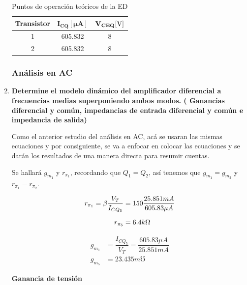 \begin{enumerate}
        \begin{table}[H]
          \centering
          \begin{tabular}{|c |c |c|}
            \hline %
            \textbf{Transistor} & $\mathbf{I_{CQ}[\mu A]}$ & $\mathbf{V_{CEQ}[\volt]}$ \\
            \hline
            1                   & 605.832                  & 8                         \\
            \hline
            2                   & 605.832                  & 8                         \\
            \hline
          \end{tabular}
          \caption{Puntos de operación teóricos de la ED}
          \label{tab:ptos_ed}
        \end{table}

        \subsubsection{Análisis en AC}

  \item \textbf{Determine el modelo dinámico del amplificador diferencial a frecuencias medias superponiendo ambos modos. ( Ganancias diferencial y común, impedancias de entrada diferencial y común e impedancia de salida)}

        Como el anterior estudio del análisis en AC, acá se usaran las mismas ecuaciones y por consiguiente, se va a enfocar en colocar las ecuaciones y se darán los resultados de una manera directa para resumir cuentas.

        Se hallará $g_{m_1}$ y $r_{\pi_1}$, recordando que $Q_1=Q_2$, así tenemos que $g_{m_1}=g_{m_2}$ y $r_{\pi_1}=r_{\pi_2}$.

        \begin{align*}
          r_{\pi_1}= \beta \dfrac{V_T}{I_{CQ_5}} & =150 \dfrac{25.851 mA}{605.83 \mu A} \nonumber \\[0.2cm]
          r_{\pi_5}                              & =6.4k \ohm
        \end{align*}

        \begin{align*}
          g_{m_1} & =\dfrac{I_{CQ_5}}{V_T}=\dfrac{605.83 \mu A}{25.851 mA} \nonumber \\[0.2cm]
          g_{m_5} & =23.435m \mho
        \end{align*}


        \textbf{Ganancia de tensión}


\end{enumerate}
